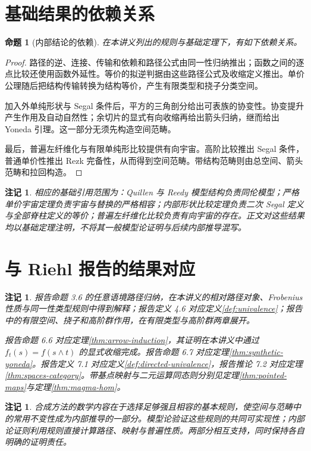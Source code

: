 \documentclass[12pt,oneside,openany,fontset=none]{ctexbook}
\theoremstyle{cn}
\newtheorem{proposition}[definition]{命题}
\newtheorem{remark}[definition]{注记}
\numberwithin{equation}{chapter}
\begin{document}
\section{基础结果的依赖关系}
\begin{proposition}[内部结论的依赖]
在本讲义列出的规则与基础定理下，有如下依赖关系。
\end{proposition}
\begin{proof}
路径的逆、连接、传输和依赖和路径公式由同一性归纳推出；函数之间的逐点比较还使用函数外延性。等价的拟逆判据由这些路径公式及收缩定义推出。单价公理随后把结构传输转换为结构等价，产生有限类型和挠子分类空间。

加入外单纯形状与 Segal 条件后，平方的三角剖分给出可表族的协变性。协变提升产生作用及自动自然性；余切片的显式有向收缩再给出箭头归纳，继而给出 Yoneda 引理。这一部分无须先构造空间范畴。

最后，普遍左纤维化与有限单纯形比较提供有向宇宙。高阶比较推出 Segal 条件，普通单价性推出 Rezk 完备性，从而得到空间范畴。带结构范畴则由总空间、箭头范畴和拉回构造。
\end{proof}
\begin{remark}
相应的基础引用范围为：Quillen 与 Reedy 模型结构负责同伦模型；严格单价宇宙定理负责宇宙与替换的严格相容；内部形状比较定理负责二次 Segal 定义与全部脊柱定义的等价；普遍左纤维化比较负责有向宇宙的存在。正文对这些结果均以基础定理注明，不将其一般模型论证明与后续内部推导混写。
\end{remark}

\section{与 Riehl 报告的结果对应}
\begin{remark}
报告命题 3.6 的任意语境路径归纳，在本讲义的相对路径对象、Frobenius 性质与同一性类型规则中得到解释；报告定义 4.6 对应定义\ref{def:univalence}；报告中的有限空间、挠子和高阶群作用，在有限类型与高阶群两章展开。

报告命题 6.6 对应定理\ref{thm:arrow-induction}，其证明在本讲义中通过 $f_t(s)=f(s\wedge t)$ 的显式收缩完成。报告命题 6.7 对应定理\ref{thm:synthetic-yoneda}。报告定义 7.1 对应定义\ref{def:directed-univalence}，报告推论 7.2 对应定理\ref{thm:spaces-category}。带基点映射与二元运算同态则分别见定理\ref{thm:pointed-maps}与定理\ref{thm:magma-hom}。
\end{remark}
\begin{remark}
合成方法的数学内容在于选择足够强且相容的基本规则，使空间与范畴中的常用不变性成为内部推导的一部分。模型论验证这些规则的共同可实现性；内部论证则利用规则直接计算路径、映射与普遍性质。两部分相互支持，同时保持各自明确的证明责任。
\end{remark}
\end{document}
